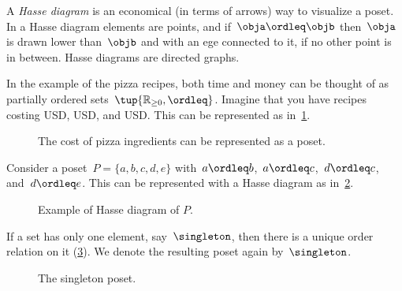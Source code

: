 A \emph{Hasse diagram} is an economical (in terms of arrows) way to visualize a poset. In a Hasse diagram elements are points, and if~$\obja \ordleq \objb$ then~$\obja$ is drawn lower than~$\objb$ and with an ege connected to it, if no other point is in between. Hasse diagrams are directed graphs.

In the example of the pizza recipes, both time and money can be thought of as partially ordered sets~$\tup{\mathbb{R}_{\geq 0},\ordleq}$. Imagine that you have recipes costing \unit[1]{USD}, \unit[2]{USD}, and \unit[3]{USD}. This can be represented as in~\cref{fig:hassepizza}.

\begin{figure}[h!]
    \begin{center}
    \caption{The cost of pizza ingredients can be represented as a poset.\label{fig:hassepizza}}
    \end{center}
\end{figure}


\begin{example}
Consider a poset~$P=\{a,b,c,d,e\}$ with~$a\ordleq b$,~$a\ordleq c$,~$d\ordleq c$, and~$d\ordleq e$. This can be represented with a Hasse diagram as in~\cref{fig:hasse}.
\end{example}

\begin{figure}[h!]
   \centering
   \caption{Example of Hasse diagram of $P$. \label{fig:hasse}}
\end{figure}

\begin{example}
\label{ex:singleton}
If a set has only one element, say~$\singleton$, then there is a unique order relation on it (\cref{fig:singleton}). We denote the resulting poset again by~$\singleton$.
\end{example}
\begin{figure}[h!]
   \centering
   \caption{The singleton poset.\label{fig:singleton}}
\end{figure}

